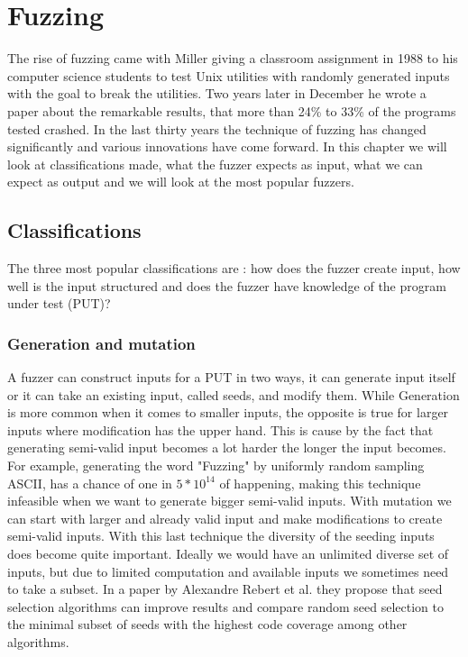 \chapter{Fuzzing}
\label{cha:2:fuzzing}
\label{fuzzing:intro}
The rise of fuzzing came with Miller giving a classroom assignment \cite{21FuzzingAssignment} in 1988 to his computer science students to test Unix utilities with randomly generated inputs with the goal to break the utilities. Two years later in December he wrote a paper \cite{4originalFuzzingUnixUtils} about the remarkable results, that more than 24\% to 33\% of the programs tested crashed.
In the last thirty years the technique of fuzzing has changed significantly and various innovations have come forward. In this chapter we will look at classifications made, what the fuzzer expects as input, what we can expect as output and we will look at the most popular fuzzers.

\section{Classifications}
\label{cha:2:Classifications}
The three most popular classifications are \cite{30FuzzingHackartandscience, 12Fuzzingasurvey, 13manes2019survey}: how does the fuzzer create input, how well is the input structured and does the fuzzer have knowledge of the program under test (PUT)?

\subsection{Generation and mutation}
\label{cha:2:generationMutation}
A fuzzer can construct inputs for a PUT in two ways, it can generate input itself or it can take an existing input, called seeds, and modify them. While Generation is more common when it comes to smaller inputs, the opposite is true for larger inputs where modification has the upper hand. This is cause by the fact that generating semi-valid input becomes a lot harder the longer the input becomes. For example, generating the word "Fuzzing" by uniformly random sampling ASCII, has a chance of one in $5*10^{14}$ of happening, making this technique infeasible when we want to generate bigger semi-valid inputs. With mutation we can start with larger and already valid input and make modifications to create semi-valid inputs. With this last technique the diversity of the seeding inputs does become quite important. Ideally we would have an unlimited diverse set of inputs, but due to limited computation and available inputs we sometimes need to take a subset. In a paper by Alexandre Rebert et al. \cite{14rebert2014seedselecting} they propose that seed selection algorithms can improve results and compare random seed selection to the minimal subset of seeds with the highest code coverage among other algorithms. 

